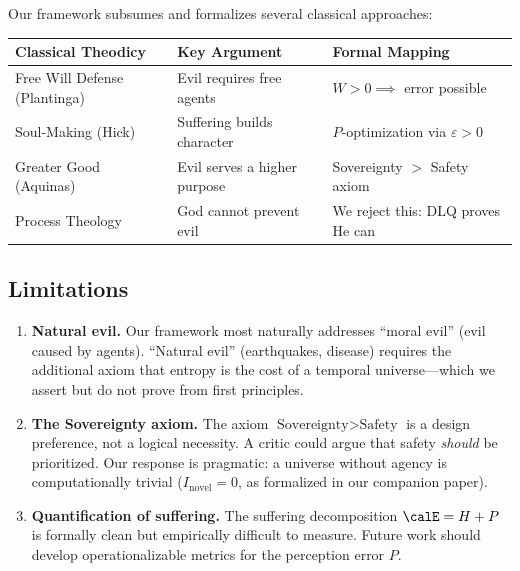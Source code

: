 \documentclass[12pt, a4paper]{article}
\theoremstyle{plain}
\theoremstyle{definition}
\begin{document}
Our framework subsumes and formalizes several classical approaches:

\begin{center}
\begin{tabular}{lll}
  \toprule
  \textbf{Classical Theodicy} & \textbf{Key Argument} & \textbf{Formal Mapping} \\
  \midrule
  Free Will Defense (Plantinga) & Evil requires free agents & $W > 0 \implies$ error possible \\
  Soul-Making (Hick) & Suffering builds character & $P$-optimization via $\varepsilon > 0$ \\
  Greater Good (Aquinas) & Evil serves a higher purpose & Sovereignty $>$ Safety axiom \\
  Process Theology & God cannot prevent evil & We reject this: DLQ proves He can \\
  \bottomrule
\end{tabular}
\end{center}

\subsection{Limitations}

\begin{enumerate}
  \item \textbf{Natural evil.} Our framework most naturally addresses ``moral
    evil'' (evil caused by agents). ``Natural evil'' (earthquakes, disease)
    requires the additional axiom that entropy is the cost of a temporal
    universe---which we assert but do not prove from first principles.

  \item \textbf{The Sovereignty axiom.} The axiom $\text{Sovereignty} >
    \text{Safety}$ is a design preference, not a logical necessity. A
    critic could argue that safety \emph{should} be prioritized. Our
    response is pragmatic: a universe without agency is computationally
    trivial ($I_{\text{novel}} = 0$, as formalized in our
    companion paper).

  \item \textbf{Quantification of suffering.} The suffering decomposition
    $\calE = H + P$ is formally clean but empirically difficult to
    measure. Future work should develop operationalizable metrics for
    the perception error $P$.
\end{enumerate}

\end{document}
